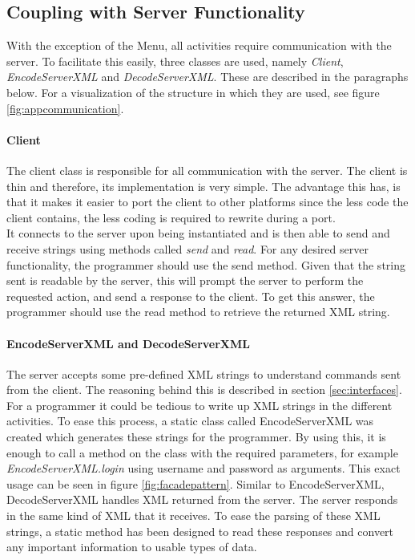 \subsection{Coupling with Server Functionality}
\label{subsec:server-coupling}
With the exception of the Menu, all activities require communication with the server. To facilitate this easily, three classes are used, namely \textit{Client}, \textit{EncodeServerXML} and \textit{DecodeServerXML}. These are described in the paragraphs below. For a visualization of the structure in which they are used, see figure \ref{fig:appcommunication}.

\paragraph{Client}
The client class is responsible for all communication with the server. The client is thin and therefore, its implementation is very simple. The advantage this has, is that it makes it easier to port the client to other platforms since the less code the client contains, the less coding is required to rewrite during a port.\\

It connects to the server upon being instantiated and is then able to send and receive strings using methods called \textit{send} and \textit{read}. For any desired server functionality, the programmer should use the send method. Given that the string sent is readable by the server, this will prompt the server to perform the requested action, and send a response to the client. To get this answer, the programmer should use the read method to retrieve the returned XML string.

\paragraph{EncodeServerXML and DecodeServerXML}
The server accepts some pre-defined XML strings to understand commands sent from the client. The reasoning behind this is described in section \ref{sec:interfaces}. For a programmer it could be tedious to write up XML strings in the different activities. To ease this process, a static class called EncodeServerXML was created which generates these strings for the programmer. By using this, it is enough to call a method on the class with the required parameters, for example \textit{EncodeServerXML.login} using username and password as arguments. This exact usage can be seen in figure \ref{fig:facadepattern}. Similar to EncodeServerXML, DecodeServerXML handles XML returned from the server. The server responds in the same kind of XML that it receives. To ease the parsing of these XML strings, a static method has been designed to read these responses and convert any important information to usable types of data.

